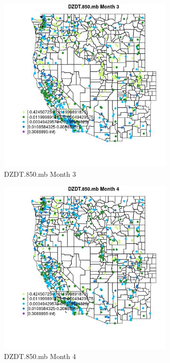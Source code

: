 \begin{figure} 
\centering  
\includegraphics[width=0.77\textwidth]{Code_Outputs/Report_ML_input_PM25_Step4_part_e_de_duplicated_aves_compiled_2019-05-14wNAs_MapObsMo3DZDT850mb.jpg} 
\caption{\label{fig:Report_ML_input_PM25_Step4_part_e_de_duplicated_aves_compiled_2019-05-14wNAsMapObsMo3DZDT850mb}DZDT.850.mb Month 3} 
\end{figure} 
 

\begin{figure} 
\centering  
\includegraphics[width=0.77\textwidth]{Code_Outputs/Report_ML_input_PM25_Step4_part_e_de_duplicated_aves_compiled_2019-05-14wNAs_MapObsMo4DZDT850mb.jpg} 
\caption{\label{fig:Report_ML_input_PM25_Step4_part_e_de_duplicated_aves_compiled_2019-05-14wNAsMapObsMo4DZDT850mb}DZDT.850.mb Month 4} 
\end{figure} 
 

